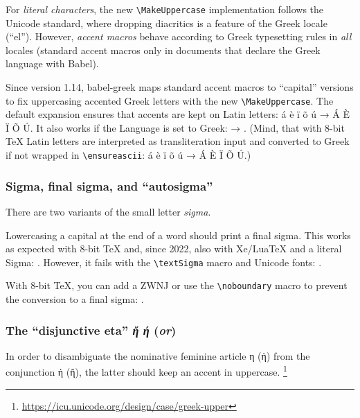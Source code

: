 \documentclass[a4paper]{article}
\newcommand*{\Greek}{\foreignlanguage{greek}}
\newcommand*{\Greek}{\ensuregreek}
\newcommand{\cs}[1]{\texttt{\textbackslash#1}}
\newcommand*{\TestUppercase}[1]{\Greek{#1 → \MakeUppercase{#1}}}
\begin{document}
For \emph{literal characters}, the new \cs{MakeUppercase}
implementation follows the Unicode standard, where dropping diacritics is a
feature of the Greek locale (``el'').
However, \emph{accent macros} behave according to Greek typesetting
rules in \emph{all} locales (standard accent macros only in documents that
declare the Greek language with Babel).

\newcommand*{\sample}{\'a \`e  \"i \~o \'u}%
Since version 1.14, babel-greek maps standard accent macros
to ``capital'' versions to fix uppercasing accented Greek letters with the new
\cs{MakeUppercase}.
The default expansion ensures that accents are kept on Latin letters:
\sample{} → \MakeUppercase{\sample}.
It also works if the Language is set to Greek:
\TestUppercase{\ensureascii{\sample}}.
\ifdefined \UnicodeEncodingName
\else
  (Mind, that with 8-bit TeX Latin letters are interpreted as transliteration
   input and converted to Greek if not wrapped in \cs{ensureascii}:
   \TestUppercase{\sample}.)
\fi


\subsubsection{Sigma, final sigma, and ``autosigma'' \label{sec:sigma}}

There are two variants of the small letter \emph{sigma}.

Lowercasing a capital  at the end of a word should print a
final sigma. This works as expected with 8-bit TeX and, since 2022, also
with Xe/LuaTeX and a literal Sigma: .
However, it fails with the \cs{textSigma} macro and Unicode fonts:
.

\ifdefined \UnicodeEncodingName
\else
  With 8-bit TeX, you can add a ZWNJ or use the \cs{noboundary} macro
  to prevent the conversion to a final sigma:
  .
\fi


\subsubsection{The ``disjunctive eta''
  \ifx\captionsgreek\captionspolutonikogreek
    \emph{ἤ}
  \else
    \emph{ή}
  \fi (\emph{or})
}

In order to disambiguate the nominative feminine article η (ἡ) from the
conjunction ή (ἤ), the latter should keep an accent in uppercase.%
\footnote{\url{https://icu.unicode.org/design/case/greek-upper}}
\end{document}
